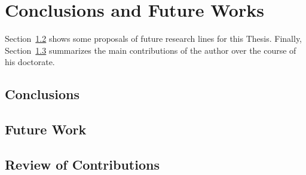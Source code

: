 \chapter{Conclusions and Future Works}
\label{chap:conclusions}
\glsresetall

Section~\ref{sec:future_work} shows some proposals of future research lines for this Thesis.
Finally, Section~\ref{sec:con_cont} summarizes the main contributions of the author over the course of his doctorate.
\lipsum[6]

\section{Conclusions}
\label{sec:conc}
\lipsum[7]

\section{Future Work}
\label{sec:future_work}
\lipsum[8]

\section{Review of Contributions}
\label{sec:con_cont}
\lipsum[9]


